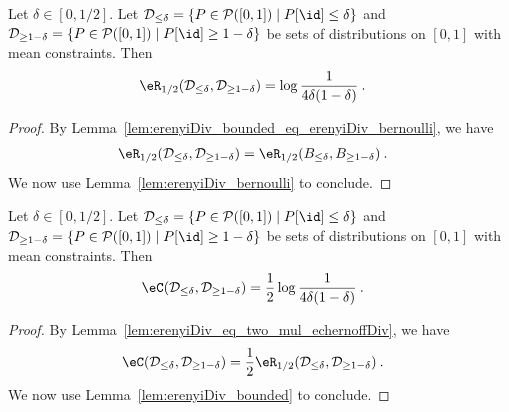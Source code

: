 \begin{lemma}\label{lem:erenyiDiv_bounded}
  \leanok
Let $\delta \in [0,1/2]$.
Let $\mathcal{D}_{\le \delta} = \{P \in \mathcal{P}([0,1]) \mid P[\id] \le \delta\}$ and $\mathcal{D}_{\ge 1 - \delta} = \{P \in \mathcal{P}([0,1]) \mid P[\id] \ge 1 - \delta\}$ be sets of distributions on $[0,1]$ with mean constraints.
Then
\begin{align*}
  \eR_{1/2}(\mathcal{D}_{\le \delta}, \mathcal{D}_{\ge 1 - \delta})
  &= \log \frac{1}{4 \delta (1 - \delta)}
  \: .
\end{align*}
\end{lemma}

\begin{proof}\leanok
By Lemma~\ref{lem:erenyiDiv_bounded_eq_erenyiDiv_bernoulli}, we have
\begin{align*}
  \eR_{1/2}(\mathcal{D}_{\le \delta}, \mathcal{D}_{\ge 1 - \delta})
  &= \eR_{1/2}(B_{\le \delta}, B_{\ge 1 - \delta})
  \: .
\end{align*}
We now use Lemma~\ref{lem:erenyiDiv_bernoulli} to conclude.
\end{proof}


\begin{lemma}\label{lem:echernoffDiv_bounded}
  \leanok
Let $\delta \in [0,1/2]$.
Let $\mathcal{D}_{\le \delta} = \{P \in \mathcal{P}([0,1]) \mid P[\id] \le \delta\}$ and $\mathcal{D}_{\ge 1 - \delta} = \{P \in \mathcal{P}([0,1]) \mid P[\id] \ge 1 - \delta\}$ be sets of distributions on $[0,1]$ with mean constraints.
Then
\begin{align*}
  \eC(\mathcal{D}_{\le \delta}, \mathcal{D}_{\ge 1 - \delta})
  &= \frac{1}{2} \log \frac{1}{4 \delta (1 - \delta)}
  \: .
\end{align*}
\end{lemma}

\begin{proof}\leanok
By Lemma~\ref{lem:erenyiDiv_eq_two_mul_echernoffDiv}, we have
\begin{align*}
  \eC(\mathcal{D}_{\le \delta}, \mathcal{D}_{\ge 1 - \delta})
  &= \frac{1}{2} \eR_{1/2}(\mathcal{D}_{\le \delta}, \mathcal{D}_{\ge 1 - \delta})
  \: .
\end{align*}
We now use Lemma~\ref{lem:erenyiDiv_bounded} to conclude.
\end{proof}


